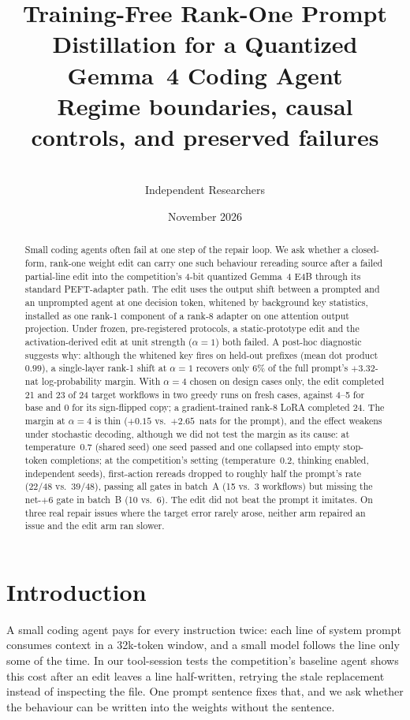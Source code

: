 \documentclass[11pt]{article}
\title{Training-Free Rank-One Prompt Distillation for a Quantized Gemma~4 Coding Agent\\[2pt]
\large Regime boundaries, causal controls, and preserved failures}
\author{\todo{Author 1} \qquad \todo{Author 2} \qquad \todo{Author 3} \\[4pt]
\normalsize Independent Researchers}
\date{November 2026}
\begin{document}
\maketitle

\begin{abstract}
Small coding agents often fail at one step of the repair loop. We ask whether a closed-form, rank-one weight edit can carry one such behaviour rereading source after a failed partial-line edit into the competition's 4-bit quantized Gemma~4 E4B through its standard PEFT-adapter path. The edit uses the output shift between a prompted and an unprompted agent at one decision token, whitened by background key statistics, installed as one rank-1 component of a rank-8 adapter on one attention output projection. Under frozen, pre-registered protocols, a static-prototype edit and the activation-derived edit at unit strength ($\alpha=1$) both failed. A post-hoc diagnostic suggests why: although the whitened key fires on held-out prefixes (mean dot product $0.99$), a single-layer rank-1 shift at $\alpha=1$ recovers only $6\%$ of the full prompt's $+3.32$-nat log-probability margin. With $\alpha=4$ chosen on design cases only, the edit completed 21 and 23 of 24 target workflows in two greedy runs on fresh cases, against 4--5 for base and 0 for its sign-flipped copy; a gradient-trained rank-8 LoRA completed 24. The margin at $\alpha=4$ is thin ($+0.15$ vs.\ $+2.65$~nats for the prompt), and the effect weakens under stochastic decoding, although we did not test the margin as its cause: at temperature~0.7 (shared seed) one seed passed and one collapsed into empty stop-token completions; at the competition's setting (temperature~0.2, thinking enabled, independent seeds), first-action rereads dropped to roughly half the prompt's rate (22/48 vs.\ 39/48), passing all gates in batch~A (15 vs.\ 3 workflows) but missing the net-$+6$ gate in batch~B (10 vs.\ 6). The edit did not beat the prompt it imitates. On three real repair issues where the target error rarely arose, neither arm repaired an issue and the edit arm ran slower.
\end{abstract}

\section{Introduction}
A small coding agent pays for every instruction twice: each line of system prompt consumes context in a 32k-token window, and a small model follows the line only some of the time. In our tool-session tests the competition's baseline agent shows this cost after an edit leaves a line half-written, retrying the stale replacement instead of inspecting the file. One prompt sentence fixes that, and we ask whether the behaviour can be written into the weights without the sentence.
\end{document}

